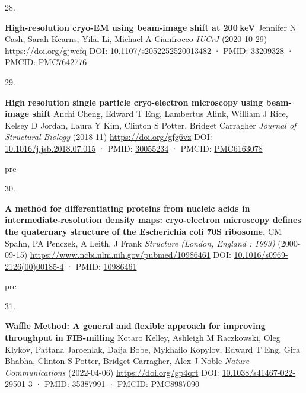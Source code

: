 \documentclass[
]{article}
\newlength{\cslhangindent}
\newlength{\csllabelwidth}
\newlength{\cslentryspacingunit} %
\newenvironment{CSLReferences}[2] %
 {%
  \setlength{\parindent}{0pt}
  \ifodd #1
  \let\oldpar\par
  \def\par{\hangindent=\cslhangindent\oldpar}
  \fi
  \setlength{\parskip}{#2\cslentryspacingunit}
 }%
 {}
\newcommand{\CSLBlock}[1]{#1\hfill\break}
\newcommand{\CSLLeftMargin}[1]{\parbox[t]{\csllabelwidth}{#1}}
\newcommand{\CSLRightInline}[1]{\parbox[t]{\linewidth - \csllabelwidth}{#1}\break}
\providecommand{\DIFaddtex}[1]{{\protect\color{blue}\uwave{#1}}} %
\providecommand{\DIFaddbegin}{} %
\providecommand{\DIFaddend}{} %
\providecommand{\DIFdelbegin}{} %
\providecommand{\DIFdelend}{} %
\providecommand{\DIFadd}[1]{\texorpdfstring{\DIFaddtex{#1}}{#1}} %
\newcommand{\DIFscaledelfig}{0.5}
\newlength{\DIFdelgraphicswidth} %
\newlength{\DIFdelgraphicsheight} %
\newcommand{\DIFaddincludegraphics}[2][]{{\color{blue}\fbox{\DIFOincludegraphics[#1]{#2}}}} %
\newcommand{\DIFdelincludegraphics}[2][]{%
\sbox{\DIFdelgraphicsbox}{\DIFOincludegraphics[#1]{#2}}%
\settoboxwidth{\DIFdelgraphicswidth}{\DIFdelgraphicsbox} %
\settoboxtotalheight{\DIFdelgraphicsheight}{\DIFdelgraphicsbox} %
\scalebox{\DIFscaledelfig}{%
\parbox[b]{\DIFdelgraphicswidth}{\usebox{\DIFdelgraphicsbox}\\[-\baselineskip] \rule{\DIFdelgraphicswidth}{0em}}\llap{\resizebox{\DIFdelgraphicswidth}{\DIFdelgraphicsheight}{%
\setlength{\unitlength}{\DIFdelgraphicswidth}%
\begin{picture}(1,1)%
\thicklines\linethickness{2pt} %
{\color[rgb]{1,0,0}\put(0,0){\framebox(1,1){}}}%
{\color[rgb]{1,0,0}\put(0,0){\line( 1,1){1}}}%
{\color[rgb]{1,0,0}\put(0,1){\line(1,-1){1}}}%
\end{picture}%
}\hspace*{3pt}}} %
} %
\DeclareRobustCommand{\DIFaddbegin}{\DIFOaddbegin \let\includegraphics\DIFaddincludegraphics} %
\DeclareRobustCommand{\DIFaddend}{\DIFOaddend \let\includegraphics\DIFOincludegraphics} %
\DeclareRobustCommand{\DIFdelbegin}{\DIFOdelbegin \let\includegraphics\DIFdelincludegraphics} %
\DeclareRobustCommand{\DIFdelend}{\DIFOaddend \let\includegraphics\DIFOincludegraphics} %
\begin{document}
\begin{CSLReferences}{0}{0}
\leavevmode{}%
\DIFdelbegin %
\DIFdelend \DIFaddbegin \CSLLeftMargin{28. }\DIFaddend %
\CSLRightInline{\textbf{High-resolution cryo-EM using beam-image shift at 200 keV}
\CSLBlock{Jennifer N Cash, Sarah Kearns, Yilai Li, Michael A Cianfrocco} \emph{IUCrJ} (2020-10-29) \url{https://doi.org/gjwcfq}
\CSLBlock{DOI: \href{https://doi.org/10.1107/s2052252520013482}{10.1107/s2052252520013482} · PMID: \href{https://www.ncbi.nlm.nih.gov/pubmed/33209328}{33209328} · PMCID: \href{https://www.ncbi.nlm.nih.gov/pmc/articles/PMC7642776}{PMC7642776}}}

\leavevmode\vadjust pre{\DIFaddbegin \hypertarget{ref-wy8cRzrH}{}}%
\CSLLeftMargin{29. }%
\CSLRightInline{\textbf{High resolution single particle cryo-electron microscopy using beam-image shift}
\CSLBlock{Anchi Cheng, Edward T Eng, Lambertus Alink, William J Rice, Kelsey D Jordan, Laura Y Kim, Clinton S Potter, Bridget Carragher} \emph{Journal of Structural Biology} (2018-11) \url{https://doi.org/gfg6vz}
\CSLBlock{DOI: \href{https://doi.org/10.1016/j.jsb.2018.07.015}{10.1016/j.jsb.2018.07.015} · PMID: \href{https://www.ncbi.nlm.nih.gov/pubmed/30055234}{30055234} · PMCID: \href{https://www.ncbi.nlm.nih.gov/pmc/articles/PMC6163078}{PMC6163078}}}

\leavevmode\vadjust \DIFadd{pre}{\hypertarget{ref-13fhsbtxo}{}}%
\CSLLeftMargin{30. }%
\CSLRightInline{\textbf{A method for differentiating proteins from nucleic acids in intermediate-resolution density maps: cryo-electron microscopy defines the quaternary structure of the Escherichia coli 70S ribosome.}
\CSLBlock{CM Spahn, PA Penczek, A Leith, J Frank} \emph{Structure (London, England : 1993)} (2000-09-15) \url{https://www.ncbi.nlm.nih.gov/pubmed/10986461}
\CSLBlock{DOI: \href{https://doi.org/10.1016/s0969-2126(00)00185-4}{10.1016/s0969-2126(00)00185-4} · PMID: \href{https://www.ncbi.nlm.nih.gov/pubmed/10986461}{10986461}}}

\leavevmode\vadjust \DIFadd{pre}{\DIFaddend \hypertarget{ref-17H2LWiIu}{}}%
\DIFdelbegin %
\DIFdelend \DIFaddbegin \CSLLeftMargin{31. }\DIFaddend %
\CSLRightInline{\textbf{Waffle Method: A general and flexible approach for improving throughput in FIB-milling}
\CSLBlock{Kotaro Kelley, Ashleigh M Raczkowski, Oleg Klykov, Pattana Jaroenlak, Daija Bobe, Mykhailo Kopylov, Edward T Eng, Gira Bhabha, Clinton S Potter, Bridget Carragher, Alex J Noble} \emph{Nature Communications} (2022-04-06) \url{https://doi.org/gp4qrt}
\CSLBlock{DOI: \href{https://doi.org/10.1038/s41467-022-29501-3}{10.1038/s41467-022-29501-3} · PMID: \href{https://www.ncbi.nlm.nih.gov/pubmed/35387991}{35387991} · PMCID: \href{https://www.ncbi.nlm.nih.gov/pmc/articles/PMC8987090}{PMC8987090}}}


\end{CSLReferences}
\end{document}
